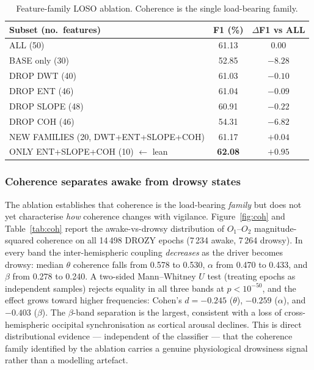 \documentclass[journal]{IEEEtran}
\begin{document}
\begin{table}[t]
\caption{Feature-family LOSO ablation. Coherence is the single load-bearing family.}
\label{tab:ablation}
\centering
\footnotesize
\setlength{\tabcolsep}{4pt}
\begin{tabular}{l c c}
\toprule
Subset (no.\ features) & F1 (\%) & \(\Delta\)F1 vs ALL \\
\midrule
ALL (50) & 61.13 & 0.00 \\
BASE only (30) & 52.85 & \(-8.28\) \\
DROP DWT (40) & 61.03 & \(-0.10\) \\
DROP ENT (46) & 61.04 & \(-0.09\) \\
DROP SLOPE (48) & 60.91 & \(-0.22\) \\
DROP COH (46) & 54.31 & \(\mathbf{-6.82}\) \\
NEW FAMILIES (20, DWT+ENT+SLOPE+COH) & 61.17 & \(+0.04\) \\
ONLY ENT+SLOPE+COH (10) \(\leftarrow\) lean & \textbf{62.08} & \(+0.95\) \\
\bottomrule
\end{tabular}
\end{table}

\subsubsection{Coherence separates awake from drowsy states}
\label{sec:coh-stats}
The ablation establishes that coherence is the load-bearing \emph{family} but does not yet characterise \emph{how} coherence changes with vigilance. Figure~\ref{fig:coh} and Table~\ref{tab:coh} report the awake-vs-drowsy distribution of \(O_1\)--\(O_2\) magnitude-squared coherence on all 14\,498 DROZY epochs (7\,234 awake, 7\,264 drowsy). In every band the inter-hemispheric coupling \emph{decreases} as the driver becomes drowsy: median \(\theta\) coherence falls from 0.578 to 0.530, \(\alpha\) from 0.470 to 0.433, and \(\beta\) from 0.278 to 0.240. A two-sided Mann--Whitney \(U\) test (treating epochs as independent samples) rejects equality in all three bands at \(p < 10^{-50}\), and the effect grows toward higher frequencies: Cohen's \(d = -0.245\) (\(\theta\)), \(-0.259\) (\(\alpha\)), and \(-0.403\) (\(\beta\)). The \(\beta\)-band separation is the largest, consistent with a loss of cross-hemispheric occipital synchronisation as cortical arousal declines. This is direct distributional evidence --- independent of the classifier --- that the coherence family identified by the ablation carries a genuine physiological drowsiness signal rather than a modelling artefact.
\end{document}
